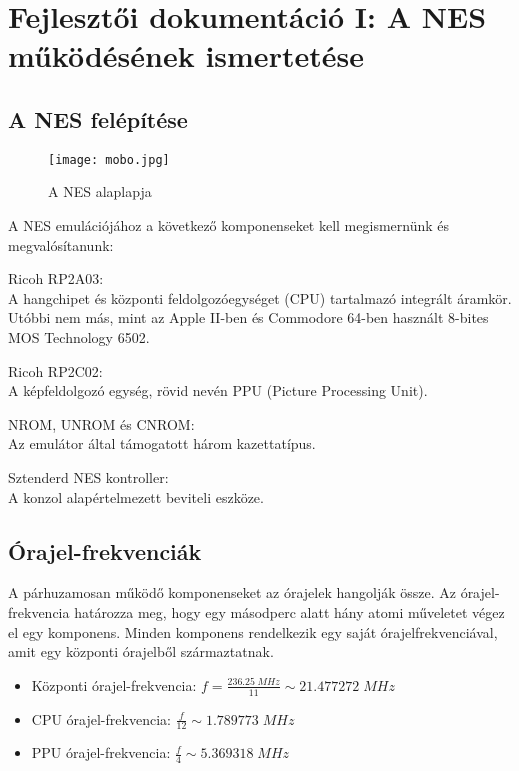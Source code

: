 \chapter{Fejlesztői dokumentáció I: A NES működésének ismertetése} %
\label{ch:impl}

\section{A NES felépítése}

\begin{figure}[H]
	\centering
	\texttt{[image: mobo.jpg]}
	\caption{A NES alaplapja}
\end{figure}

A NES emulációjához a következő komponenseket kell megismernünk és megvalósítanunk:

\begin{compactdesc}
	\item[Ricoh RP2A03:] 
	\hfill \\
	A hangchipet és központi feldolgozóegységet (CPU) tartalmazó integrált áramkör. Utóbbi nem más, mint az Apple II-ben és Commodore 64-ben használt 8-bites MOS Technology 6502.
	\item[Ricoh RP2C02:]
	\hfill \\
	A képfeldolgozó egység, rövid nevén PPU (Picture Processing Unit).
	\item[NROM, UNROM és CNROM:] 
	\hfill \\
	Az emulátor által támogatott három kazettatípus.
	\item[Sztenderd NES kontroller:] 
	\hfill \\
	A konzol alapértelmezett beviteli eszköze.
\end{compactdesc}

\section{Órajel-frekvenciák}
A párhuzamosan működő komponenseket az órajelek hangolják össze. Az órajel-frekvencia határozza meg, hogy egy másodperc alatt hány atomi műveletet végez el egy komponens.
Minden komponens rendelkezik egy saját órajelfrekvenciával, amit egy központi órajelből származtatnak.

\begin{itemize}
	\item Központi órajel-frekvencia: $ f = \frac{236.25\;MHz}{11} \sim 21.477272\; MHz $
	\item CPU órajel-frekvencia: $ \frac{f}{12} \sim 1.789773 \; MHz  $
	\item PPU órajel-frekvencia: $ \frac{f}{4}  \sim 5.369318 \; MHz $
\end{itemize}

